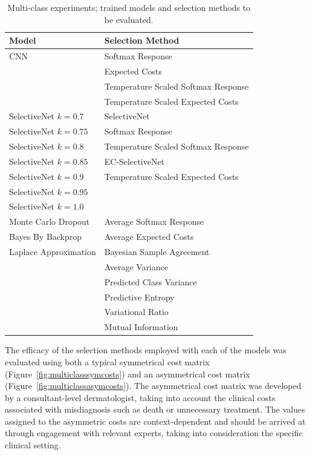 \begin{table}[h]
	\centering
	\caption{Multi-class experiments; trained models and selection methods to be evaluated.}
	\label{tab:multi-class-experiment-setup}
	\begin{tabular}{|l|l|}
		\hline
		Model & Selection Method \\ \hline
		CNN & Softmax Response \\
		& Expected Costs \\
		& Temperature Scaled Softmax Response \\
		& Temperature Scaled Expected Costs \\ \hline
		SelectiveNet $k=0.7$ & SelectiveNet \\
		SelectiveNet $k=0.75$ & Softmax Response \\
		SelectiveNet $k=0.8$ & Temperature Scaled Softmax Response \\
		SelectiveNet $k=0.85$ & EC-SelectiveNet \\
		SelectiveNet $k=0.9$ & Temperature Scaled Expected Costs \\
		SelectiveNet $k=0.95$ &  \\
		SelectiveNet $k=1.0$ &  \\ \hline
		Monte Carlo Dropout & Average Softmax Response \\
		Bayes By Backprop & Average Expected Costs \\
		Laplace Approximation & Bayesian Sample Agreement \\
		& Average Variance \\
		& Predicted Class Variance \\
		& Predictive Entropy \\
		& Variational Ratio \\
		& Mutual Information \\ \hline
	\end{tabular}
\end{table}

The efficacy of the selection methods employed with each of the models was evaluated using both a typical symmetrical cost matrix (Figure~\ref{fig:multiclasssymcosts}) and an asymmetrical cost matrix (Figure~\ref{fig:multiclassasymcosts}). The asymmetrical cost matrix was developed by a consultant-level dermatologist, taking into account the clinical costs associated with misdiagnosis such as death or unnecessary treatment. The values assigned to the asymmetric costs are context-dependent and should be arrived at through engagement with relevant experts, taking into consideration the specific clinical setting.

